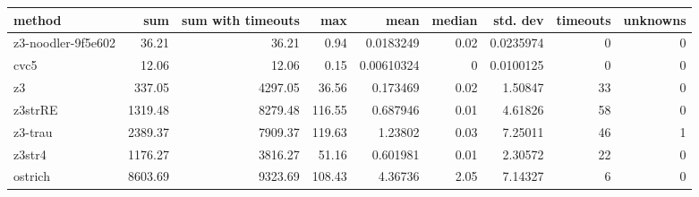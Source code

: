 \begin{tabular}{lrrrrrrrr}
\hline
 method             &     sum &   sum with timeouts &    max &       mean &   median &   std. dev &   timeouts &   unknowns \\
\hline
 z3-noodler-9f5e602 &   36.21 &               36.21 &   0.94 & 0.0183249  &     0.02 &  0.0235974 &          0 &          0 \\
 cvc5               &   12.06 &               12.06 &   0.15 & 0.00610324 &     0    &  0.0100125 &          0 &          0 \\
 z3                 &  337.05 &             4297.05 &  36.56 & 0.173469   &     0.02 &  1.50847   &         33 &          0 \\
 z3strRE            & 1319.48 &             8279.48 & 116.55 & 0.687946   &     0.01 &  4.61826   &         58 &          0 \\
 z3-trau            & 2389.37 &             7909.37 & 119.63 & 1.23802    &     0.03 &  7.25011   &         46 &          1 \\
 z3str4             & 1176.27 &             3816.27 &  51.16 & 0.601981   &     0.01 &  2.30572   &         22 &          0 \\
 ostrich            & 8603.69 &             9323.69 & 108.43 & 4.36736    &     2.05 &  7.14327   &          6 &          0 \\
\hline
\end{tabular}
